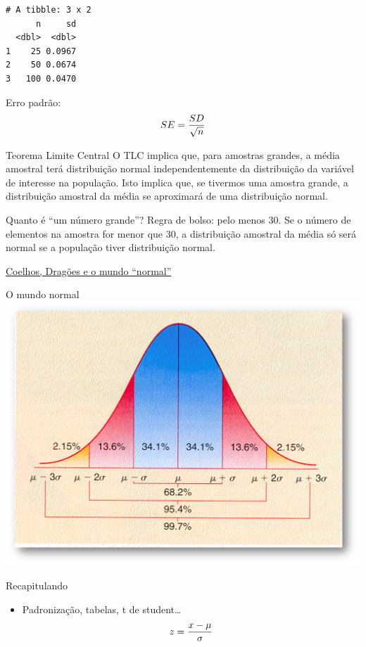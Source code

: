 \documentclass[
  9pt,
  ignorenonframetext,
  aspectratio=169]{beamer}
\providecommand{\tightlist}{%
  \setlength{\itemsep}{0pt}\setlength{\parskip}{0pt}}
\begin{document}
\begin{frame}[fragile]{}
\protect\hypertarget{section-4}{}
\begin{verbatim}
# A tibble: 3 x 2
      n     sd
  <dbl>  <dbl>
1    25 0.0967
2    50 0.0674
3   100 0.0470
\end{verbatim}

Erro padrão: \[ 
\Huge
SE=\frac{SD}{\sqrt{n}} 
\]
\end{frame}

\begin{frame}{Teorema Limite Central}
\protect\hypertarget{teorema-limite-central}{}
O TLC implica que, para amostras grandes, a média amostral terá
distribuição normal independentemente da distribuição da variável de
interesse na população. Isto implica que, se tivermos uma amostra
grande, a distribuição amostral da média se aproximará de uma
distribuição normal.

Quanto é ``um número grande''? Regra de bolso: pelo menos 30. Se o
número de elementos na amostra for menor que 30, a distribuição amostral
da média só será normal se a população tiver distribuição normal.

\href{https://www.youtube.com/watch?v=jvoxEYmQHNM\&feature=youtu.be}{Coelhos,
Dragões e o mundo ``normal''}
\end{frame}

\begin{frame}{O mundo normal}
\protect\hypertarget{o-mundo-normal}{}
\includegraphics{imgs/normal_percent.png}
\end{frame}

\begin{frame}{Recapitulando}
\protect\hypertarget{recapitulando}{}
\begin{itemize}
\tightlist
\item
  Padronização, tabelas, t de student\ldots{} \[
  \Huge
  z=\frac{x-\mu}{\sigma}
  \]
\end{itemize}
\end{frame}
\end{document}
